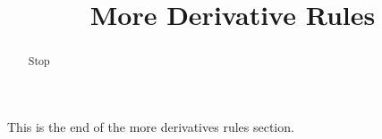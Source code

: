 \documentclass[handout]{ximera}
\title{More Derivative Rules}
\begin{document}
\begin{abstract} Stop
\end{abstract}

\maketitle

This is the end of the more derivatives rules section.
\end{document}
